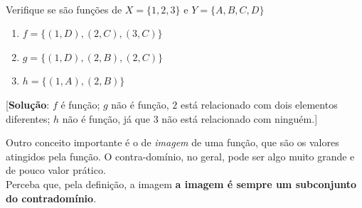 \label{def:funcao}\\
	


\begin{inlinexer}
Verifique se são funções de $X = \{1,2,3\}$ e $Y=\{A,B,C,D\}$ 
\begin{enumerate}
    \item $f = \{ (1,D) , (2,C), (3,C)\}$
    \item $g = \{(1,D),(2,B),(2,C)\}$
    \item $h = \{(1,A),(2,B)\}$
\end{enumerate}
\begin{flushright}
\tiny[\textbf{Solução}: $f$ é função; $g$ não é função, $2$ está relacionado com dois elementos diferentes; $h$ não é função, já que $3$ não está relacionado com ninguém.]
\end{flushright}
\end{inlinexer}

Outro conceito importante é o de \textit{imagem} de uma função, que são os valores atingidos pela função. O contra-domínio, no geral, pode ser algo muito grande e de pouco valor prático. 
\label{def:imagem}\\
Perceba que, pela definição, a imagem \textbf{a imagem é sempre um subconjunto do contradomínio}.

